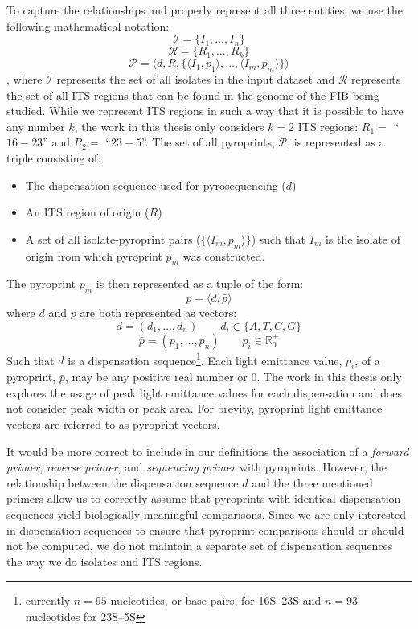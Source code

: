 \documentclass[12pt]{ucthesis}
\begin{document}
      To capture the relationships and properly represent all three entities,
      we use the following mathematical notation:
      $$\mathcal{I} = \{I_1, \ldots, I_n\}$$
      $$\mathcal{R} = \{R_1, \ldots, R_k\}$$
      $$\mathcal{P} = \langle d, R, \{\langle I_1, p_1 \rangle, \ldots,
                      \langle I_m, p_m \rangle \} \rangle$$,
      where $\mathcal{I}$ represents the set of all isolates in the input
      dataset and $\mathcal{R}$ represents the set of all ITS regions that can
      be found in the genome of the FIB being studied. While we represent ITS
      regions in such a way that it is possible to have any number $k$, the
      work in this thesis only considers $k=2$ ITS regions: $R_1 =$ ``$16-23$''
      and $R_2 =$ ``$23-5$''. The set of all pyroprints, $\mathcal{P}$, is
      represented as a triple consisting of:
      \begin{itemize}
         \item The dispensation sequence used for pyrosequencing ($d$)
         \item An ITS region of origin ($R$)
         \item A set of all isolate-pyroprint pairs ($\{\langle I_m, p_m\rangle\}$) such
               that $I_m$ is the isolate of origin from which pyroprint $p_m$
               was constructed.
      \end{itemize}
      The pyroprint $p_m$ is then represented as a tuple of the form:
      $$p = \langle d, \bar{p}\rangle$$
      where $d$ and $\bar{p}$ are both represented as vectors:
      $$d = (d_1, \ldots, d_n) \qquad d_i \in \{A, T, C, G\}$$
      $$\bar{p} = (p_1, \ldots, p_n) \qquad p_i \in \mathds{R}_0^+$$
      Such that $d$ is a dispensation sequence\footnote{currently $n=95$
      nucleotides, or base pairs, for 16S--23S and $n=93$ nucleotides for
      23S--5S}. Each light emittance value, $p_i$, of a pyroprint, $\bar{p}$,
      may be any positive real number or $0$. The work in this thesis only
      explores the usage of peak light emittance values for each dispensation
      and does not consider peak width or peak area. For brevity, pyroprint
      light emittance vectors are referred to as pyroprint vectors.
      
      It would be more correct to include in our definitions the
      association of a \textit{forward primer}, \textit{reverse primer}, and
      \textit{sequencing primer} with pyroprints. However, the relationship
      between the dispensation sequence $d$ and the three mentioned primers
      allow us to correctly assume that pyroprints with identical dispensation
      sequences yield biologically meaningful comparisons. Since we are only
      interested in dispensation sequences to ensure that pyroprint comparisons
      should or should not be computed, we do not maintain a separate set of
      dispensation sequences the way we do isolates and ITS regions.
      
\end{document}

